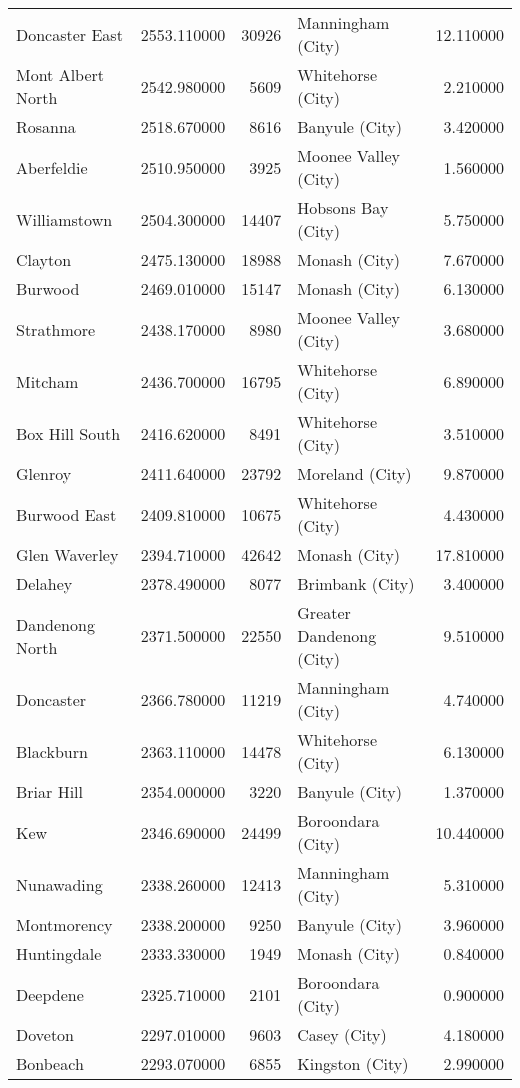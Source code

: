 \begin{longtable}{lrrlr}
Doncaster East & 2553.110000 & 30926 & Manningham (City) & 12.110000 \\
Mont Albert North & 2542.980000 & 5609 & Whitehorse (City) & 2.210000 \\
Rosanna & 2518.670000 & 8616 & Banyule (City) & 3.420000 \\
Aberfeldie & 2510.950000 & 3925 & Moonee Valley (City) & 1.560000 \\
Williamstown & 2504.300000 & 14407 & Hobsons Bay (City) & 5.750000 \\
Clayton & 2475.130000 & 18988 & Monash (City) & 7.670000 \\
Burwood & 2469.010000 & 15147 & Monash (City) & 6.130000 \\
Strathmore & 2438.170000 & 8980 & Moonee Valley (City) & 3.680000 \\
Mitcham & 2436.700000 & 16795 & Whitehorse (City) & 6.890000 \\
Box Hill South & 2416.620000 & 8491 & Whitehorse (City) & 3.510000 \\
Glenroy & 2411.640000 & 23792 & Moreland (City) & 9.870000 \\
Burwood East & 2409.810000 & 10675 & Whitehorse (City) & 4.430000 \\
Glen Waverley & 2394.710000 & 42642 & Monash (City) & 17.810000 \\
Delahey & 2378.490000 & 8077 & Brimbank (City) & 3.400000 \\
Dandenong North & 2371.500000 & 22550 & Greater Dandenong (City) & 9.510000 \\
Doncaster & 2366.780000 & 11219 & Manningham (City) & 4.740000 \\
Blackburn & 2363.110000 & 14478 & Whitehorse (City) & 6.130000 \\
Briar Hill & 2354.000000 & 3220 & Banyule (City) & 1.370000 \\
Kew & 2346.690000 & 24499 & Boroondara (City) & 10.440000 \\
Nunawading & 2338.260000 & 12413 & Manningham (City) & 5.310000 \\
Montmorency & 2338.200000 & 9250 & Banyule (City) & 3.960000 \\
Huntingdale & 2333.330000 & 1949 & Monash (City) & 0.840000 \\
Deepdene & 2325.710000 & 2101 & Boroondara (City) & 0.900000 \\
Doveton & 2297.010000 & 9603 & Casey (City) & 4.180000 \\
Bonbeach & 2293.070000 & 6855 & Kingston (City) & 2.990000 \\

\end{longtable}
